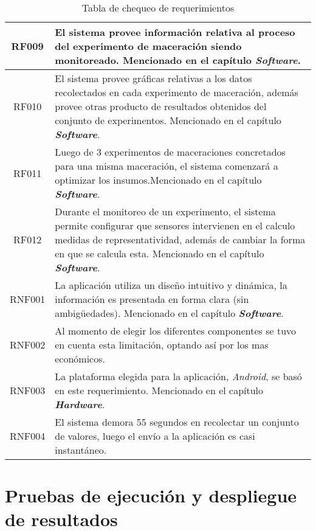 \begin{table}[h]
\begin{tabularx}{\textwidth}{|X|X|}
        \hline
        \multicolumn{1}{|c|}{RF009}  & El sistema provee información relativa al proceso del experimento de maceración siendo monitoreado. Mencionado en el capítulo \textit{\textbf{Software}}.  \\
        \hline
        \multicolumn{1}{|c|}{RF010}  & El sistema provee gráficas relativas a los datos recolectados en cada experimento de maceración, además provee otras producto de resultados obtenidos del conjunto de experimentos. Mencionado en el capítulo \textit{\textbf{Software}}. \\
        \hline
        \multicolumn{1}{|c|}{RF011}  & Luego de 3 experimentos de maceraciones concretados para una misma maceración, el sistema comenzará a optimizar los insumos.Mencionado en el capítulo \textit{\textbf{Software}}. \\
        \hline
        \multicolumn{1}{|c|}{RF012}  & Durante el monitoreo de un experimento, el sistema permite configurar que sensores intervienen en el calculo medidas de representatividad, además de cambiar la forma en que se calcula esta. Mencionado en el capítulo \textit{\textbf{Software}}. \\
        \hline
        \multicolumn{1}{|c|}{RNF001}  & La aplicación utiliza un diseño intuitivo y dinámica, la información es presentada en forma clara (sin ambigüedades). Mencionado en el capítulo \textit{\textbf{Software}}. \\
        \hline
        \multicolumn{1}{|c|}{RNF002}  & Al momento de elegir los diferentes componentes se tuvo en cuenta esta limitación, optando así por los mas económicos.\\
        \hline
        \multicolumn{1}{|c|}{RNF003}  & La plataforma elegida para la aplicación, \textit{Android},  se basó en este requerimiento. Mencionado en el capítulo \textit{\textbf{Hardware}}. \\
        \hline
        \multicolumn{1}{|c|}{RNF004}  & El sistema demora 55 segundos en recolectar un conjunto de valores, luego el envío a la aplicación es casi instantáneo. \\
        \hline
     \end{tabularx}
     \caption{Tabla de chequeo de requerimientos}
     \label{tab:TablaChequeoRequerimientos}
 \end{table}

\section{Pruebas de ejecución y despliegue de resultados}

